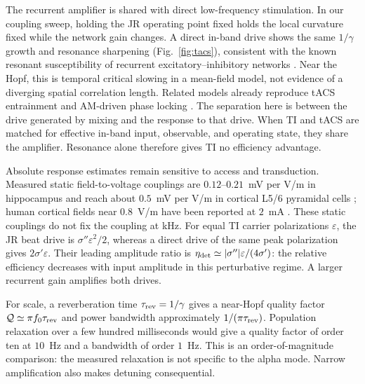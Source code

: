 \documentclass[11pt,a4paper]{article}
\newcommand{\Sig}{\sigma}
\begin{document}
The recurrent amplifier is shared with direct low-frequency stimulation. In our
coupling sweep, holding the JR operating point fixed holds the local curvature
fixed while the network gain changes. A direct in-band drive shows the same
$1/\gamma$ growth and resonance sharpening (Fig.~\ref{fig:tacs}), consistent with
the known resonant susceptibility of recurrent excitatory--inhibitory networks
\cite{ledoux2011,clusella2023}. Near the Hopf, this is temporal critical slowing
in a mean-field model, not evidence of a diverging spatial correlation length.
Related models already reproduce tACS entrainment and AM-driven phase locking
\cite{ali2013,negahbani2018,krause2023}. The separation here is between the drive
generated by mixing and the response to that drive. When TI and tACS are matched
for effective in-band input, observable, and operating state, they share the
amplifier. Resonance alone therefore gives TI no efficiency advantage.

Absolute response estimates remain sensitive to access and transduction.
Measured static field-to-voltage couplings are $0.12$--$0.21$~mV per V/m in
hippocampus \cite{bikson2004,deans2007} and reach about $0.5$~mV per V/m in cortical
L5/6 pyramidal cells \cite{radman2009}; human cortical fields near $0.8$~V/m have
been reported at $2$~mA \cite{huang2017,huang2017corr}. These static couplings do
not fix the coupling at kHz. For equal TI carrier polarizations $\varepsilon$,
the JR beat drive is $\Sig''\varepsilon^2/2$, whereas a direct drive of the same
peak polarization gives $2\Sig'\varepsilon$. Their leading amplitude ratio is
$\eta_{\rm det}\simeq|\Sig''|\varepsilon/(4\Sig')$: the relative efficiency decreases
with input amplitude in this perturbative regime. A larger recurrent gain
amplifies both drives.

For scale, a reverberation time $\tau_{\rm rev}=1/\gamma$ gives a near-Hopf
quality factor $\mathcal Q\simeq\pi f_0\tau_{\rm rev}$ and power bandwidth
approximately $1/(\pi\tau_{\rm rev})$. Population relaxation over a few hundred
milliseconds \cite{wilting2018} would give a quality factor of order ten at
$10$~Hz and a bandwidth of order $1$~Hz. This is an order-of-magnitude comparison:
the measured relaxation is not specific to the alpha mode. Narrow amplification
also makes detuning consequential.
\end{document}
